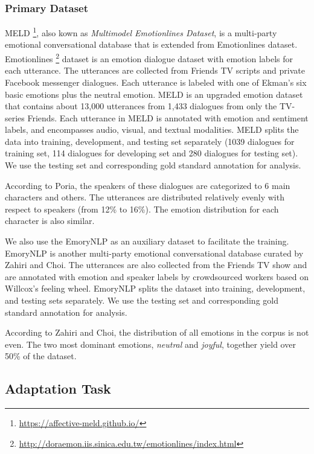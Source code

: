 \documentclass[11pt]{article}
\begin{document}
\subsubsection{Primary Dataset}

MELD \citep{poria-etal-2019-meld} \footnote{\url{https://affective-meld.github.io/}}, also kown as \textit{Multimodel Emotionlines Dataset}, is a multi-party emotional conversational database that is extended from Emotionlines dataset. 
Emotionlines \citep{hsu-etal-2018-emotionlines}\footnote{\url{http://doraemon.iis.sinica.edu.tw/emotionlines/index.html}} dataset is an emotion dialogue dataset with emotion labels for each utterance. The utterances are collected from Friends TV scripts and private Facebook messenger dialogues. Each utterance is labeled with one of Ekman’s six basic emotions plus the neutral emotion. MELD is an upgraded emotion dataset that contains about 13,000 utterances from 1,433 dialogues from only the TV-series Friends. Each utterance in MELD is annotated with emotion and sentiment labels, and encompasses audio, visual, and textual modalities. 
MELD splits the data into training, development, and testing set separately (1039 dialogues for training set, 114 dialogues for developing set and 280 dialogues for testing set). We use the testing set and corresponding gold standard annotation for analysis.

According to Poria, the speakers of these dialogues are categorized to 6 main characters and others. The utterances are distributed relatively evenly with respect to speakers (from 12\% to 16\%).  The emotion distribution for each character is also similar. 

We also use the EmoryNLP \citep{EmoryNLP} as an auxiliary dataset to facilitate the training. EmoryNLP is another multi-party emotional conversational database curated by Zahiri and Choi. The utterances are also collected from the Friends TV show and are annotated with emotion and speaker labels by crowdsourced workers based on Willcox's feeling wheel. EmoryNLP splits the dataset into training, development, and testing sets separately. We use the testing set and corresponding gold standard annotation for analysis. 

According to Zahiri and Choi, the distribution of all emotions in the corpus is not even. The two most dominant emotions, \textit{neutral} and \textit{joyful}, together yield over 50\% of the dataset.

\subsection{Adaptation Task}
\label{sect:adaptation_task}
\end{document}
